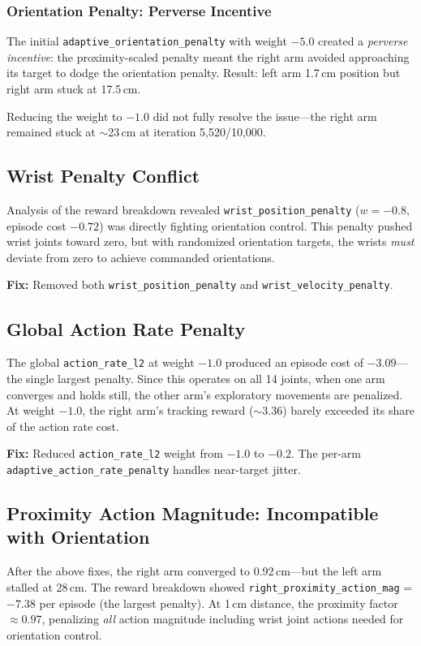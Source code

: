 \documentclass[11pt,a4paper]{article}
\begin{document}
\subsubsection{Orientation Penalty: Perverse Incentive}
The initial \texttt{adaptive\_orientation\_penalty} with weight $-5.0$ created a \emph{perverse incentive}: the proximity-scaled penalty meant the right arm avoided approaching its target to dodge the orientation penalty. Result: left arm 1.7\,cm position but right arm stuck at 17.5\,cm.

Reducing the weight to $-1.0$ did not fully resolve the issue---the right arm remained stuck at $\sim$23\,cm at iteration 5,520/10,000.

\subsection{Wrist Penalty Conflict}
\label{sec:wrist_conflict}
Analysis of the reward breakdown revealed \texttt{wrist\_position\_penalty} ($w=-0.8$, episode cost $-0.72$) was directly fighting orientation control. This penalty pushed wrist joints toward zero, but with randomized orientation targets, the wrists \emph{must} deviate from zero to achieve commanded orientations.

\textbf{Fix:} Removed both \texttt{wrist\_position\_penalty} and \texttt{wrist\_velocity\_penalty}.

\subsection{Global Action Rate Penalty}
\label{sec:action_rate}
The global \texttt{action\_rate\_l2} at weight $-1.0$ produced an episode cost of $-3.09$---the single largest penalty. Since this operates on all 14 joints, when one arm converges and holds still, the other arm's exploratory movements are penalized. At weight $-1.0$, the right arm's tracking reward ($\sim$3.36) barely exceeded its share of the action rate cost.

\textbf{Fix:} Reduced \texttt{action\_rate\_l2} weight from $-1.0$ to $-0.2$. The per-arm \texttt{adaptive\_action\_rate\_penalty} handles near-target jitter.

\subsection{Proximity Action Magnitude: Incompatible with Orientation}
\label{sec:prox_action}
After the above fixes, the right arm converged to 0.92\,cm---but the left arm stalled at 28\,cm. The reward breakdown showed \texttt{right\_proximity\_action\_mag} = $-7.38$ per episode (the largest penalty). At 1\,cm distance, the proximity factor $\approx 0.97$, penalizing \emph{all} action magnitude including wrist joint actions needed for orientation control.
\end{document}

